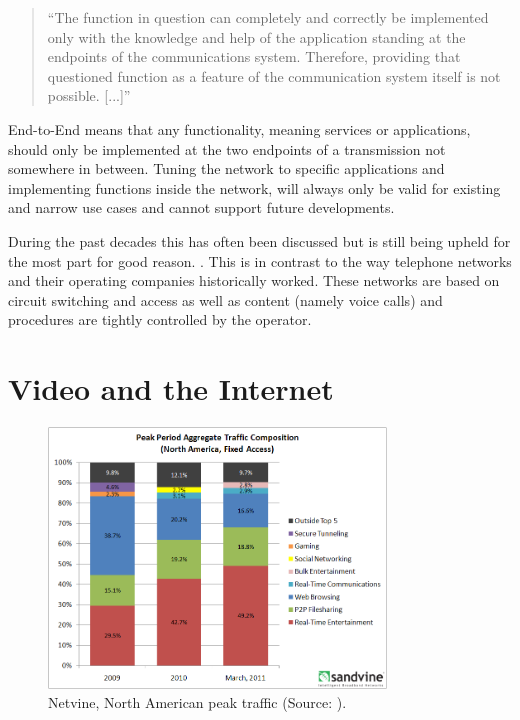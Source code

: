 \begin{quote}
``The function in question can completely and correctly be implemented only with the knowledge and help of the application standing at the endpoints of the communications system. Therefore, providing that questioned function as a feature of the communication system itself is not possible. [...]''
\end{quote}

End-to-End means that any functionality, meaning services or applications, should only be implemented at the two endpoints of a transmission not somewhere in between. Tuning the network to specific applications and implementing functions inside the network, will always only be valid for existing and narrow use cases and cannot support future developments.

During the past decades this has often been discussed  \cite{bhattacharjee1997active, blumenthal2001rethinking, isenberg1997rise, lemley2000end} but is still being upheld for the most part for good reason. . This is in contrast to the way telephone networks and their operating companies historically worked. These networks are based on circuit switching and access as well as content (namely voice calls) and procedures are tightly controlled by the operator.

\section{Video and the Internet}

\begin{figure}[htbp]
    \centering
    \includegraphics[width=0.8\textwidth]{images/netvine.png}
    \caption{Netvine, North American peak traffic (Source: \cite{sandvine_spring2011,sandvine_spring2013}).}
    \label{c1:fig:traffic_netvine}
\end{figure}

